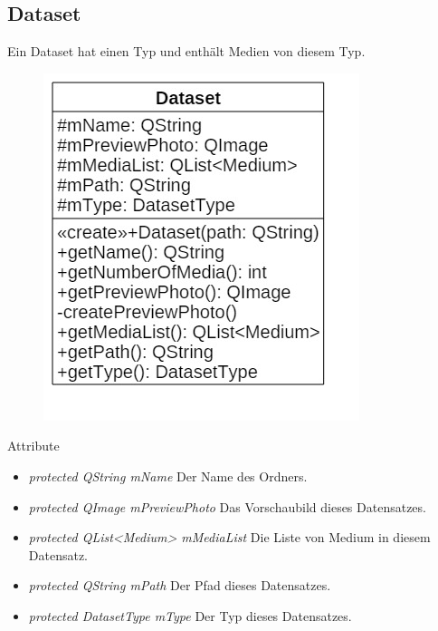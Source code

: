 \subsection*{Dataset}
Ein Dataset hat einen Typ und enthält Medien von diesem Typ.

\begin{figure}[H]
\centering
\includegraphics[scale=0.5]{img/Klassendiagramm/Klassen/Model/Dataset}
\label{fig:dataset}
\end{figure}

Attribute
\begin{itemize}
\item\textit{protected QString mName} Der Name des Ordners.
\item\textit{protected QImage mPreviewPhoto} Das Vorschaubild dieses Datensatzes.
\item\textit{protected QList<Medium> mMediaList} Die Liste von Medium in diesem Datensatz.
\item\textit{protected QString mPath} Der Pfad dieses Datensatzes.
\item\textit{protected DatasetType mType} Der Typ dieses Datensatzes.
\end{itemize}

